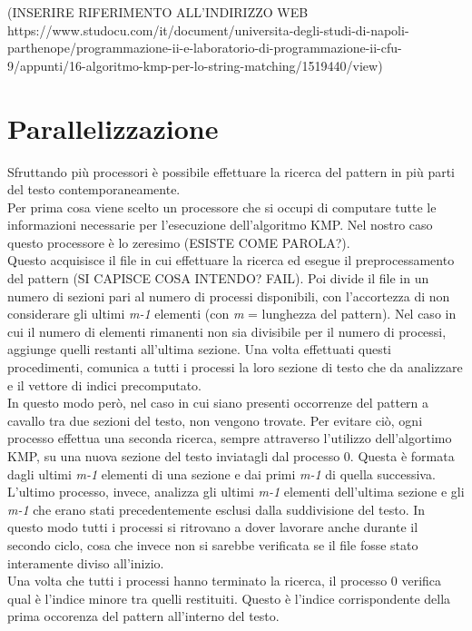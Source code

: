 (INSERIRE RIFERIMENTO ALL'INDIRIZZO WEB\\ https://www.studocu.com/it/document/universita-degli-studi-di-napoli-parthenope/programmazione-ii-e-laboratorio-di-programmazione-ii-cfu-9/appunti/16-algoritmo-kmp-per-lo-string-matching/1519440/view)


\section{Parallelizzazione}
Sfruttando più processori è possibile effettuare la ricerca del pattern in più parti del testo contemporaneamente.\\
Per prima cosa viene scelto un processore che si occupi di computare tutte le informazioni necessarie per l'esecuzione dell'algoritmo KMP. Nel nostro caso questo processore è lo zeresimo (ESISTE COME PAROLA?). \\
Questo acquisisce il file in cui effettuare la ricerca ed esegue il preprocessamento del pattern (SI CAPISCE COSA INTENDO? FAIL). Poi divide il file in un numero di sezioni pari al numero di processi disponibili, con l'accortezza di  non considerare gli ultimi {\itshape m-1} elementi (con {\itshape m} = lunghezza del pattern). Nel caso in cui il numero di elementi rimanenti non sia divisibile per il numero di processi, aggiunge quelli restanti all'ultima sezione. Una volta effettuati questi procedimenti, comunica a tutti i processi la loro sezione di testo che da analizzare e il vettore di indici precomputato. \\
In questo modo però, nel caso in cui siano presenti occorrenze del pattern a cavallo tra due sezioni del testo, non vengono trovate. Per evitare ciò, ogni processo effettua una seconda ricerca, sempre attraverso l'utilizzo dell'algortimo KMP, su una nuova sezione del testo inviatagli dal processo 0. Questa è formata dagli ultimi {\itshape m-1} elementi di una sezione e dai primi {\itshape m-1} di quella successiva. L'ultimo processo, invece, analizza gli ultimi {\itshape m-1} elementi dell'ultima sezione e gli {\itshape m-1} che erano stati precedentemente esclusi dalla suddivisione del testo. In questo modo tutti i processi si ritrovano a dover lavorare anche durante il secondo ciclo, cosa che invece non si sarebbe verificata se il file fosse stato interamente diviso all'inizio.\\
Una volta che tutti i processi hanno terminato la ricerca, il processo 0 verifica qual è l'indice minore tra quelli restituiti. Questo è l'indice corrispondente della prima occorenza del pattern all'interno del testo.



























